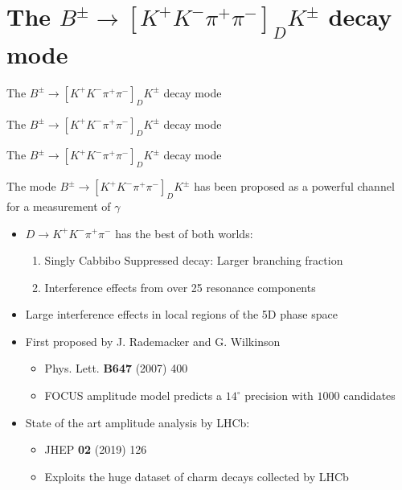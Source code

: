 \documentclass{beamer}
\begin{document}
\section{The \texorpdfstring{$B^\pm\to[K^+K^-\pi^+\pi^-]_DK^\pm$}{B2DKD2KKpipi} decay mode}
\begin{frame}{The $B^\pm\to[K^+K^-\pi^+\pi^-]_DK^\pm$ decay mode}
  \begin{center}
    {\huge The $B^\pm\to[K^+K^-\pi^+\pi^-]_DK^\pm$ decay mode}
  \end{center}
\end{frame}

\begin{frame}{The $B^\pm\to[K^+K^-\pi^+\pi^-]_DK^\pm$ decay mode}
  \begin{center}
    \Large The mode $B^\pm\to[K^+K^-\pi^+\pi^-]_DK^\pm$ has been proposed as a powerful channel for a measurement of $\gamma$
  \end{center}
  \begin{itemize}
    \setlength\itemsep{1.0em}
    \item{$D\to K^+K^-\pi^+\pi^-$ has the best of both worlds:}
    \begin{enumerate}
      \item{Singly Cabbibo Suppressed decay: Larger branching fraction}
      \item{Interference effects from over 25 resonance components}
    \end{enumerate}
    \item{Large interference effects in local regions of the 5D phase space}
    \item{First proposed by J. Rademacker and G. Wilkinson}
    \begin{itemize}
      \item{Phys. Lett. \textbf{B647} (2007) 400}
      \item{FOCUS amplitude model predicts a $14^\circ$ precision with $1000$ candidates}
    \end{itemize}
    \item{State of the art amplitude analysis by LHCb:}
    \begin{itemize}
      \item{JHEP \textbf{02} (2019) 126}
      \item{Exploits the huge dataset of charm decays collected by LHCb}
    \end{itemize}
  \end{itemize}
\end{frame}
\end{document}
